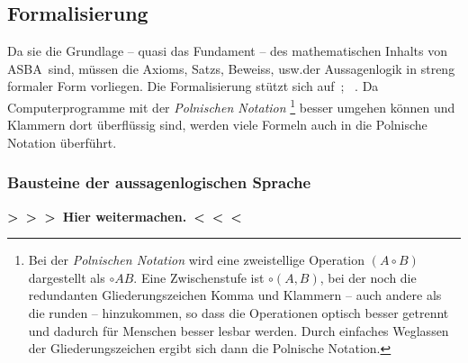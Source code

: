 \documentclass[english,ngerman,parskip=half,headsepline,footsepline,
	fleqn,notitlepage]{scrreprt}
\makeatletter
\newcommand*{\todo}[1]{\textbf{>~>~>~#1~<~<~<}}%
\newcommand*{\textusw}{usw.\@ }
\newcommand*{\glsidx}[1]{\gls{#1}\idx{\gls{#1}}}%
\newcommand*{\glsidxPl}[1]{\glspl{#1}\idx{\gls{#1}}}%
\newcommand*{\ASBA}{\textsf{\glsidx{ASBA}}}
\makeatother
\begin{document}
	\subsection{Formalisierung}%
	\label{sub:Formalisierung}

	Da sie die Grundlage
	-- quasi das Fundament --
	des mathematischen Inhalts von \ASBA\ sind,
	müssen die \glsidxPl{Axiom}, \glsidxPl{Satz}, \glsidxPl{Beweis}, \textusw der Aussagenlogik
	in streng formaler Form vorliegen.
	Die Formalisierung stützt sich auf~\cite{bib:Aussagenlogik};
	\alsoname~\cite{bib:LogikDe, bib:LogikEn}.
	Da Computerprogramme mit der
	\emph{Polnischen Notation}%
	\footnote{%
		Bei der \emph{Polnischen Notation} wird eine zweistellige
		Operation $(A\circ B)$ dargestellt als $\circ A B$.
		Eine Zwischenstufe ist $\circ(A,B)$,
		bei der noch die redundanten Gliederungszeichen Komma und Klammern
		-- auch andere als die runden --
		hinzukommen, so dass die Operationen optisch besser getrennt
		und dadurch für Menschen besser lesbar werden.
		Durch einfaches Weglassen der Gliederungszeichen
		ergibt sich dann die Polnische Notation.%
	}
	besser umgehen können und Klammern dort überflüssig sind,
	werden viele Formeln auch in die Polnische Notation überführt.

	\subsubsection{Bausteine der aussagenlogischen Sprache}%
	\label{subsub:Bausteine}

\todo{Hier weitermachen.}%
\end{document}
